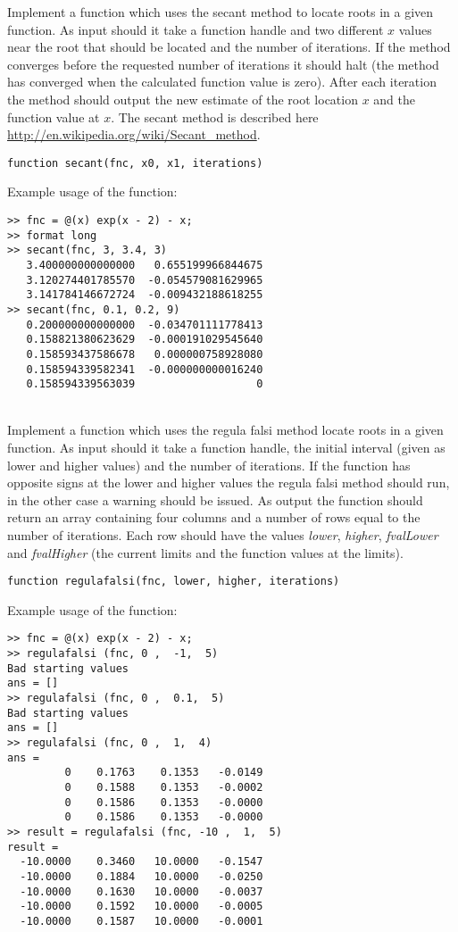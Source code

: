 \begin{ex}
Implement a function which uses the secant method to locate roots in a given function.
As input should it take a function handle and two different $x$ values near the root 
that should be located and the number of iterations.
If the method converges before the requested number of iterations it should halt 
(the method has converged when the calculated function value is zero).
After each iteration the method should output the new estimate of the root location $x$
and the function value at $x$.
The secant method is described here \url{http://en.wikipedia.org/wiki/Secant_method}.

\begin{lstlisting}
function secant(fnc, x0, x1, iterations)
\end{lstlisting}
Example usage of the function:
\begin{lstlisting}
>> fnc = @(x) exp(x - 2) - x;
>> format long
>> secant(fnc, 3, 3.4, 3)
   3.400000000000000   0.655199966844675
   3.120274401785570  -0.054579081629965
   3.141784146672724  -0.009432188618255
>> secant(fnc, 0.1, 0.2, 9)
   0.200000000000000  -0.034701111778413
   0.158821380623629  -0.000191029545640
   0.158593437586678   0.000000758928080
   0.158594339582341  -0.000000000016240
   0.158594339563039                   0
\end{lstlisting}
\end{ex}



\begin{ex}\\
Implement a function which uses the regula falsi method locate roots in a given function.
As input should it take a function handle, the initial interval (given as 
lower and higher values) and the number of iterations.
If the function has opposite signs at the lower and higher values the 
regula falsi method should run, in the other case a warning should be issued.
As output the function should return an array containing four columns and a number of 
rows equal to the number of iterations.
Each row should have the values \emph{lower}, \emph{higher}, \emph{fvalLower} and 
\emph{fvalHigher} (the current limits and the function values at the limits).

\begin{lstlisting}
function regulafalsi(fnc, lower, higher, iterations)
\end{lstlisting}
Example usage of the function:
\begin{lstlisting}
>> fnc = @(x) exp(x - 2) - x;
>> regulafalsi (fnc, 0 ,  -1,  5)
Bad starting values
ans = []
>> regulafalsi (fnc, 0 ,  0.1,  5)
Bad starting values
ans = []
>> regulafalsi (fnc, 0 ,  1,  4)
ans =
         0    0.1763    0.1353   -0.0149
         0    0.1588    0.1353   -0.0002
         0    0.1586    0.1353   -0.0000
         0    0.1586    0.1353   -0.0000
>> result = regulafalsi (fnc, -10 ,  1,  5)
result =
  -10.0000    0.3460   10.0000   -0.1547
  -10.0000    0.1884   10.0000   -0.0250
  -10.0000    0.1630   10.0000   -0.0037
  -10.0000    0.1592   10.0000   -0.0005
  -10.0000    0.1587   10.0000   -0.0001
\end{lstlisting}
\end{ex}

